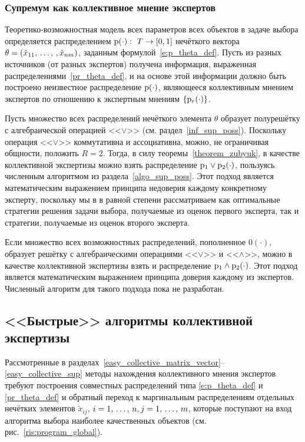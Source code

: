\subsubsection{Супремум как коллективное мнение экспертов}

Теоретико-возможностная модель всех параметров всех объектов в задаче выбора определяется распределением ${\mathrm{p}}(\cdot):\ T\to[0,1]$ нечёткого вектора $\theta = (\tilde x_{11}, \, \ldots,\,, \tilde x_{nm})$, заданным формулой~\eqref{e:p_theta_def}. Пусть из разных источников (от разных экспертов) получена информация, выраженная распределениями~\eqref{pr_theta_def}, и на основе этой информации должно быть построено неизвестное распределение ${\mathrm{p}}(\cdot)$, являющееся коллективным мнением экспертов по отношению к экспертным мнениям $\{{\mathrm{p}}_r(\cdot)\}$. 

Пусть множество всех распределений нечёткого элемента $\theta$ образует полурешётку с алгебраической операцией <<$\vee$>> (см. раздел~\ref{inf_sup_poss}). Поскольку операция <<$\vee$>> коммутативна и ассоциативна, можно, не ограничивая общности, положить $R = 2$. Тогда, в силу теоремы~\ref{theorem_zubyuk}, в качестве коллективной экспертизы можно взять распределение ${\mathrm{p}}_1 \vee{\mathrm{p}}_2(\cdot)$, пользуясь численным алгоритмом из раздела~\ref{algo_sup_poss}. Этот подход является математическим выражением принципа недоверия каждому конкретному эксперту, поскольку мы в в равной степени рассматриваем как оптимальные стратегии решения задачи выбора, получаемые из оценок первого эксперта, так и стратегии, получаемые из оценок второго эксперта. 
\begin{notice}
  Если множество всех возможностных распределений, пополненное $0(\cdot)$, образует решётку с алгебраическими операциями <<$\vee$>> и <<$\wedge$>>, можно в качестве коллективной экспертизы взять и распределение ${\mathrm{p}}_1\wedge{\mathrm{p}}_2(\cdot)$. Этот подход является математическим выражением принципа доверия каждому из экспертов. Численный алгоритм для такого подхода пока не разработан.  
\end{notice}

\subsection{<<Быстрые>> алгоритмы коллективной экспертизы }

Рассмотренные в разделах~\ref{easy_collective_matrix_vector}--\ref{easy_collective_sup} методы нахождения коллективного мнения экспертов требуют построения совместных распределений типа \eqref{e:p_theta_def} и \eqref{pr_theta_def} и обратный переход к маргинальным распределениям отдельных нечётких элементов $\tilde x_{ij}$, $i = 1,\, \ldots,\, n, j = 1,\, \ldots,\, m$, которые поступают на вход алгоритма выбора наиболее качественных объектов (см. рис.~\ref{ris:program_global}).


